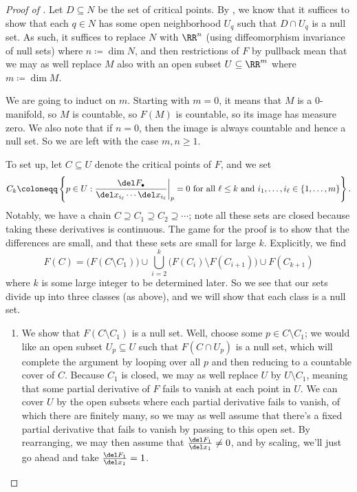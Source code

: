 \documentclass[../notes.tex]{subfiles}
\begin{document}
\begin{proof}[Proof of ]
	Let $D\subseteq N$ be the set of critical points. By , we know that it suffices to show that each $q\in N$ has some open neighborhood $U_q$ such that $D\cap U_q$ is a null set. As such, it suffices to replace $N$ with $\RR^n$ (using diffeomorphism invariance of null sets) where $n\coloneqq\dim N$, and then restrictions of $F$ by pullback mean that we may as well replace $M$ also with an open subset $U\subseteq\RR^m$ where $m\coloneqq\dim M$.

	We are going to induct on $m$. Starting with $m=0$, it means that $M$ is a $0$-manifold, so $M$ is countable, so $F(M)$ is countable, so its image has measure zero. We also note that if $n=0$, then the image is always countable and hence a null set. So we are left with the case $m,n\ge1$.

	To set up, let $C\subseteq U$ denote the critical points of $F$, and we set
	\[C_k\coloneqq\left\{p\in U:\frac{\del F_\bullet}{\del x_{i_\ell}\cdots\del x_{i_\ell}}\bigg|_p=0\text{ for all }\ell\le k\text{ and }i_1,\ldots,i_\ell\in\{1,\ldots,m\}\right\}.\]
	Notably, we have a chain $C\supseteq C_1\supseteq C_2\supseteq\cdots$; note all these sets are closed because taking these derivatives is continuous. The game for the proof is to show that the differences are small, and that these sets are small for large $k$. Explicitly, we find
	\[F(C)=\big(F(C\setminus C_1)\big)\cup\bigcup_{i=2}^k\big(F(C_i)\setminus F(C_{i+1})\big)\cup F(C_{k+1})\]
	where $k$ is some large integer to be determined later. So we see that our sets divide up into three classes (as above), and we will show that each class is a null set.
	\begin{enumerate}
		\item We show that $F(C\setminus C_1)$ is a null set. Well, choose some $p\in C\setminus C_1$; we would like an open subset $U_p\subseteq U$ such that $F(C\cap U_p)$ is a null set, which will complete the argument by looping over all $p$ and then reducing to a countable cover of $C$. Because $C_1$ is closed, we may as well replace $U$ by $U\setminus C_1$, meaning that some partial derivative of $F$ fails to vanish at each point in $U$. We can cover $U$ by the open subsets where each partial derivative fails to vanish, of which there are finitely many, so we may as well assume that there's a fixed partial derivative that fails to vanish by passing to this open set. By rearranging, we may then assume that $\frac{\del F_1}{\del x_1}\ne0$, and by scaling, we'll just go ahead and take $\frac{\del F_1}{\del x_1}=1$.


\end{enumerate}
\end{proof}
\end{document}
